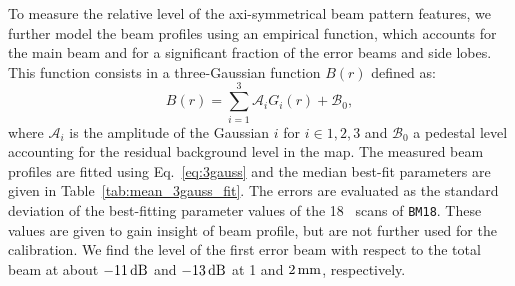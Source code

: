 {\lp To measure the relative level of the axi-symmetrical beam pattern
features, we further model the beam profiles using an empirical function,
which accounts for the main beam and for a significant fraction of the
error beams and side lobes. This function consists in a three-Gaussian
function $B(r)$ defined as:
\begin{equation}
  B(r) = \sum_{i=1}^{3} \mathcal{A}_i G_i(r) + \mathcal{B}_0,
  \label{eq:3gauss}
\end{equation}
where $\mathcal{A}_i$ is the amplitude of the Gaussian $i$ for
$i \in {1, 2, 3}$ and $\mathcal{B}_0$ a pedestal level accounting for
the residual background level in the map. The measured beam profiles
are fitted using Eq.~\ref{eq:3gauss} and the median best-fit
parameters are given in Table~\ref{tab:mean_3gauss_fit}. The errors
are evaluated as the standard deviation of the best-fitting parameter
values of the 18 \bm\ scans of {\tt BM18}.
These values are given to gain insight of beam profile, but are not
further used for the calibration. We find the level of the first error
beam with respect to the total beam at about $-11\,\rm{dB}$ and
$-13\,\rm{dB}$ at 1 and $2\,\rm{mm}$, respectively.}
%
